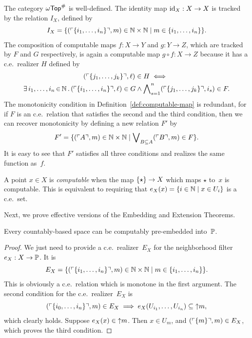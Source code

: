 The category $\mathsf{\omega Top}^{\#}$ is well-defined. The identity map $\mathrm{id}_X:
X \to X$ is tracked by the relation $I_X$, defined by
%
\begin{equation*}
  I_X = \{
    (\ulcorner \{i_1, \ldots, i_n\} \urcorner, m) \in \mathbb{N} \times \mathbb{N} \mid
    m \in \{i_1, \ldots, i_n\}
  \}.
\end{equation*}
%
The composition of computable maps $f: X \to Y$ and $g: Y \to Z$,
which are tracked by $F$ and $G$ respectively, is again a computable
map $g \circ f: X \to Z$ because it has a c.e.~realizer $H$ defined by
%
\begin{multline*}
  (\ulcorner \{j_1, \ldots, j_k\} \urcorner, \ell) \in H
  \iff {} \\
    \exists\, i_1, \ldots, i_n \,{\in}\, \mathbb{N}\,.\,
      (\ulcorner \{i_1, \ldots, i_n\} \urcorner, \ell) \in G \land
      \bigwedge\nolimits_{s = 1}^{n}
      (\ulcorner \{j_1, \ldots, j_k\} \urcorner, i_s) \in F
   .
\end{multline*}
%
The monotonicity condition in Definition~\ref{def:computable-map} is
redundant, for if $F$ is an c.e.~relation that satisfies the second
and the third condition, then we can recover monotonicity by defining
a new relation $F'$ by
%
\begin{equation*}
  F' = \{(\ulcorner A \urcorner, m) \in \mathbb{N} \times \mathbb{N} \mid
    \bigvee\nolimits_{B \subseteq A} (\ulcorner B \urcorner, m) \in F
  \}.
\end{equation*}
%
It is easy to see that $F'$ satisfies all three conditions and
realizes the same function as~$f$.

A point $x \in X$ is \emph{computable} when the map $\{\star\} \to
X$ which maps $\star$ to~$x$ is computable. This is equivalent to
requiring that $e_X(x) = \{i \in \mathbb{N} \mid x \in U_i\}$ is a
c.e.~set.

Next, we prove effective versions of the Embedding and Extension
Theorems.

\begin{theorem}
  \label{th:computable_embedding_theorem}%
  Every countably-based space can be computably pre-embedded
  into~$\mathbb{P}$.
\end{theorem}

\begin{proof}
  We just need to provide a c.e.~realizer~$E_X$ for the neighborhood
  filter $e_X : X \to \mathbb{P}$. It is
  \begin{equation*}
    E_X = \{
      (\ulcorner \{i_1, \ldots, i_n\} \urcorner, m) \in \mathbb{N} \times \mathbb{N} \mid
      m \in \{i_1, \ldots, i_n\}
    \}.
  \end{equation*}
  This is obviously a c.e.~relation which is monotone in the first
  argument. The second condition for the c.e.~realizer~$E_X$ is
  \begin{equation*}
     (\ulcorner \{i_0, \ldots, i_n\} \urcorner, m) \in E_X
     \implies
     e_X(U_{i_1}, \ldots, U_{i_n}) \subseteq {\uparrow}m,
  \end{equation*}
  which clearly holds.
  Suppose $e_X(x) \in {\uparrow}m$. Then $x \in U_m$, and
  $(\ulcorner \{m\} \urcorner, m) \in E_X$, which proves the third condition.
\end{proof}

